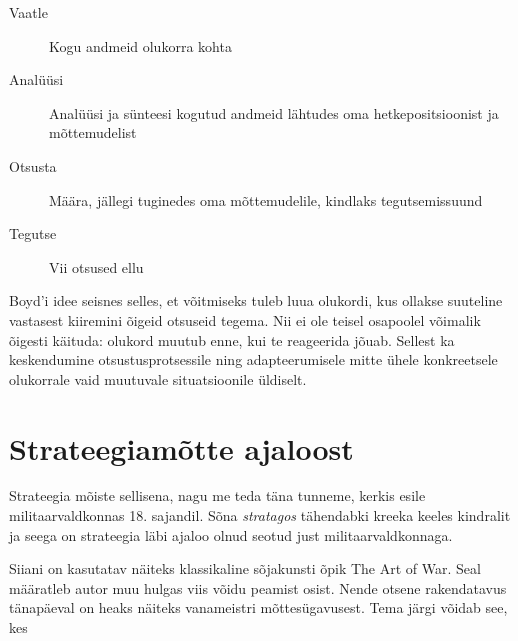 \documentclass{tufte-book}
\begin{document}
\begin{description}
	\item[Vaatle] Kogu andmeid olukorra kohta
	\item[Analüüsi] Analüüsi ja sünteesi kogutud andmeid lähtudes oma hetkepositsioonist ja mõttemudelist
	\item[Otsusta] Määra, jällegi tuginedes oma mõttemudelile, kindlaks tegutsemissuund
	\item[Tegutse] Vii otsused ellu
\end{description}


Boyd'i idee seisnes selles, et võitmiseks tuleb luua olukordi, kus ollakse suuteline vastasest kiiremini õigeid otsuseid tegema. Nii ei ole teisel osapoolel võimalik õigesti käituda: olukord muutub enne, kui te reageerida jõuab. Sellest ka keskendumine otsustusprotsessile ning adapteerumisele mitte ühele konkreetsele olukorrale vaid muutuvale situatsioonile üldiselt.

\section{Strateegiamõtte ajaloost}
Strateegia mõiste sellisena, nagu me teda täna tunneme, kerkis esile militaarvaldkonnas 18. sajandil. Sõna \emph{stratagos} tähendabki kreeka keeles kindralit ja seega on strateegia läbi ajaloo olnud seotud just militaarvaldkonnaga.

Siiani on kasutatav näiteks klassikaline sõjakunsti õpik The Art of War\cite{tzu2013art}. Seal määratleb autor muu hulgas viis võidu peamist osist. Nende otsene rakendatavus tänapäeval on heaks näiteks vanameistri mõttesügavusest. Tema järgi võidab see, kes
\end{document}
